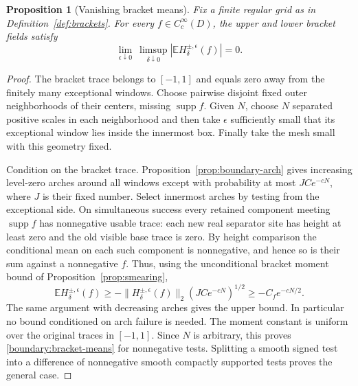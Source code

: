 \documentclass[11pt]{article}
\newcommand{\E}{\mathbb E}
\DeclareMathOperator{\supp}{supp}
\newtheorem{proposition}[theorem]{Proposition}
\theoremstyle{definition}
\theoremstyle{remark}
\numberwithin{equation}{section}
\begin{document}
\begin{proposition}[Vanishing bracket means]
\label{prop:bracket-collapse}
Fix a finite regular grid as in Definition~\ref{def:brackets}.
For every $f\in C_c^\infty(D)$, the upper and lower bracket fields
satisfy
\begin{equation}
 \lim_{\epsilon\downarrow0}\ \limsup_{\delta\downarrow0}
 \left|\E H_\delta^{\pm,\epsilon}(f)\right|=0.
 \label{boundary:bracket-means}
\end{equation}
\end{proposition}

\begin{proof}
The bracket trace belongs to $[-1,1]$ and equals zero away from the
finitely many exceptional windows.  Choose pairwise disjoint fixed
outer neighborhoods of their centers, missing $\supp f$.  Given
$N$, choose $N$ separated positive scales in each neighborhood and
then take $\epsilon$ sufficiently small that its exceptional
window lies inside the innermost box.  Finally take the mesh small
with this geometry fixed.

Condition on the bracket trace.  Proposition~\ref{prop:boundary-arch}
gives increasing level-zero arches around all windows except with
probability at most $JC e^{-cN}$, where $J$ is their fixed number.
Select innermost arches by testing from the exceptional side.  On
simultaneous success every retained component meeting $\supp f$
has nonnegative usable trace: each new real separator site has
height at least zero and the old visible base trace is zero.  By
height comparison the conditional mean on each such component is
nonnegative, and hence so is their sum against a nonnegative $f$.
Thus, using the unconditional bracket moment bound
of Proposition~\ref{prop:smearing},
\[
 \E H_\delta^{\pm,\epsilon}(f)
 \ge -\|H_\delta^{\pm,\epsilon}(f)\|_2
       (JC e^{-cN})^{1/2}
 \ge -C_f e^{-cN/2}.
\]
The same argument with decreasing arches gives the upper bound.
In particular no bound conditioned on arch failure is needed.
The moment constant is uniform over the original traces in
$[-1,1]$.  Since $N$ is arbitrary, this proves
\eqref{boundary:bracket-means} for nonnegative tests.  Splitting a
smooth signed test into a difference of nonnegative smooth compactly
supported tests proves the general case.

\end{proof}
\end{document}
